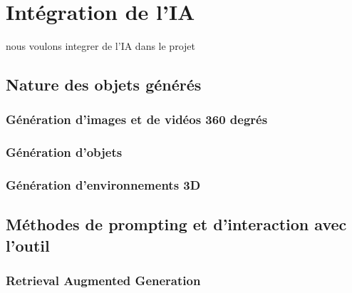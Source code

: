 \section{Intégration de l'IA}
nous voulons integrer de l'IA dans le projet 

\subsection{Nature des objets générés}
\subsubsection{Génération d'images et de vidéos 360 degrés}

\subsubsection{Génération d'objets}

\subsubsection{Génération d'environnements 3D}



\subsection{Méthodes de prompting et d'interaction avec l'outil}
\subsubsection{Retrieval Augmented Generation}